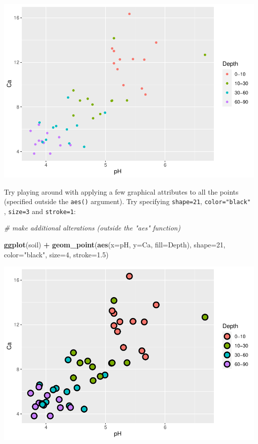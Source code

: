 \documentclass[
]{article}
\newenvironment{Shaded}{\begin{snugshade}}{\end{snugshade}}
\newcommand{\AttributeTok}[1]{\textcolor[rgb]{0.13,0.29,0.53}{#1}}
\newcommand{\CommentTok}[1]{\textcolor[rgb]{0.56,0.35,0.01}{\textit{#1}}}
\newcommand{\DecValTok}[1]{\textcolor[rgb]{0.00,0.00,0.81}{#1}}
\newcommand{\FloatTok}[1]{\textcolor[rgb]{0.00,0.00,0.81}{#1}}
\newcommand{\FunctionTok}[1]{\textcolor[rgb]{0.13,0.29,0.53}{\textbf{#1}}}
\newcommand{\NormalTok}[1]{#1}
\newcommand{\SpecialCharTok}[1]{\textcolor[rgb]{0.81,0.36,0.00}{\textbf{#1}}}
\newcommand{\StringTok}[1]{\textcolor[rgb]{0.31,0.60,0.02}{#1}}
\begin{document}
\includegraphics{module1_3_files/figure-latex/unnamed-chunk-26-1.pdf}

Try playing around with applying a few graphical attributes to all the
points (specified outside the \texttt{aes()} argument). Try specifying
\texttt{shape=21}, \texttt{color="black"} , \texttt{size=3} and
\texttt{stroke=1}:

\begin{Shaded}
\begin{Highlighting}[]
\CommentTok{\# make additional alterations (outside the "aes" function)}

\FunctionTok{ggplot}\NormalTok{(soil) }\SpecialCharTok{+}
  \FunctionTok{geom\_point}\NormalTok{(}\FunctionTok{aes}\NormalTok{(}\AttributeTok{x=}\NormalTok{pH, }\AttributeTok{y=}\NormalTok{Ca, }\AttributeTok{fill=}\NormalTok{Depth), }\AttributeTok{shape=}\DecValTok{21}\NormalTok{, }\AttributeTok{color=}\StringTok{"black"}\NormalTok{, }\AttributeTok{size=}\DecValTok{4}\NormalTok{, }\AttributeTok{stroke=}\FloatTok{1.5}\NormalTok{)}
\end{Highlighting}
\end{Shaded}

\includegraphics{module1_3_files/figure-latex/unnamed-chunk-27-1.pdf}
\end{document}
